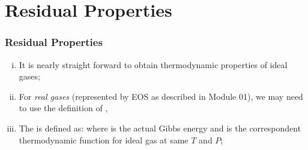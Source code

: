 \documentclass[10pt,compress,handout,unknownkeysallowed]{beamer}
\begin{document}
\section{Residual Properties}
\begin{frame}
  \frametitle{Residual Properties}
     \begin{enumerate}[i)]
        \item<1-> It is nearly straight forward to obtain thermodynamic properties of ideal gases;
        \item<2-> For {\it real gases} (represented by EOS as described in Module 01), we may need to use the definition of , \ie
        \item<3->The  is defined as:
            where  is the actual Gibbs energy and  is the correspondent thermodynamic function for ideal gas at same $T$ and $P$;
     \end{enumerate}

\end{frame}
\normalsize
\end{document}
